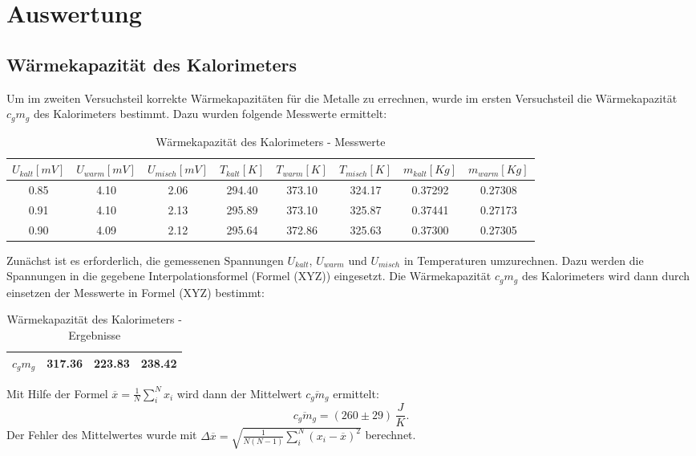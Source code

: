 \documentclass[11pt,ngerman,a4paper]{article}
\begin{document}
\section{Auswertung}
\subsection{Wärmekapazität des Kalorimeters}
Um im zweiten Versuchsteil korrekte Wärmekapazitäten für die Metalle zu errechnen, wurde im ersten Versuchsteil die Wärmekapazität $c_gm_g$ des Kalorimeters bestimmt. Dazu wurden folgende Messwerte ermittelt:
\begin{table}[H]
\centering
\begin{tabular}{|c|c|c|c|c|c|c|c|}
\hline
$U_{kalt}[mV]$ &$U_{warm}[mV]$ &$U_{misch}[mV]$ & $T_{kalt}[K]$ & $T_{warm}[K]$ & $T_{misch}[K]$ & $m_{kalt}[Kg]$ & $ m_{warm} [Kg]$ \\
\hline
0.85 & 4.10 & 2.06 & 294.40 & 373.10 & 324.17 & 0.37292 & 0.27308\\
0.91 & 4.10 & 2.13 & 295.89 & 373.10 & 325.87 & 0.37441 & 0.27173\\
0.90 & 4.09 & 2.12 & 295.64 & 372.86 & 325.63 & 0.37300 & 0.27305\\
\hline
\end{tabular}
\caption{Wärmekapazität des Kalorimeters - Messwerte}
\end{table}
\noindent
Zunächst ist es erforderlich, die gemessenen Spannungen $U_{kalt}$, $U_{warm}$ und $U_{misch}$ in Temperaturen umzurechnen. Dazu werden die Spannungen in die gegebene Interpolationsformel (Formel (XYZ)) eingesetzt. Die Wärmekapazität $c_gm_g$ des Kalorimeters wird dann durch einsetzen der Messwerte in Formel (XYZ) bestimmt:
\begin{table}[H]
\centering
\begin{tabular}{|l|c|c|c|}
\hline
$c_gm_g$ & 317.36 & 223.83 & 238.42 \\
\hline
\end{tabular}
\caption{Wärmekapazität des Kalorimeters - Ergebnisse}
\end{table}
\noindent
Mit Hilfe der Formel $ \overline{x}=\frac{1}{N}\sum_{i}^N x_i$ wird dann der Mittelwert $\overline{c_gm_g}$ ermittelt:
\[ \overline{c_gm_g}= (260 \pm 29)\,\frac{J}{K}. \]
Der Fehler des Mittelwertes wurde mit $\Delta \overline{x}=\sqrt{\frac{1}{N(N-1)}\sum_{i}^N(x_i-\overline{x})^2}$ berechnet.
\end{document}
